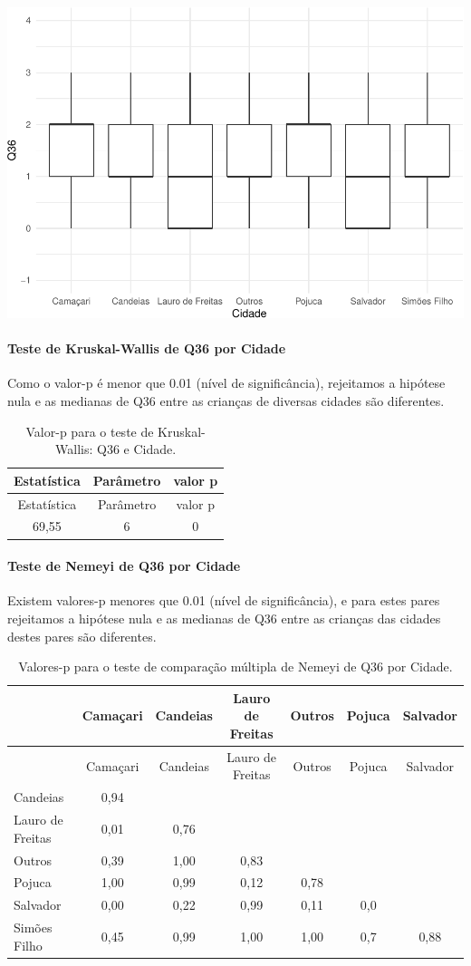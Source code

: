 \documentclass[]{article}
\let\oldparagraph\paragraph
\renewcommand{\paragraph}[1]{\oldparagraph{#1}\mbox{}}
\begin{document}
\begin{center}\includegraphics[width=0.75\linewidth]{relatorio_covid19_files/figure-latex/unnamed-chunk-1315-1} \end{center}

\hypertarget{teste-de-kruskal-wallis-de-q36-por-cidade}{%
\paragraph{Teste de Kruskal-Wallis de Q36 por Cidade}\label{teste-de-kruskal-wallis-de-q36-por-cidade}}

Como o valor-p é menor que 0.01 (nível de significância), rejeitamos a hipótese nula e as medianas de Q36 entre as crianças de diversas cidades são diferentes.

\begin{longtable}[]{@{}ccc@{}}
\caption{\label{tab:unnamed-chunk-1317}Valor-p para o teste de Kruskal-Wallis: Q36 e Cidade.}\tabularnewline
\toprule
Estatística & Parâmetro & valor p\tabularnewline
\midrule
\endfirsthead
\toprule
Estatística & Parâmetro & valor p\tabularnewline
\midrule
\endhead
69,55 & 6 & 0\tabularnewline
\bottomrule
\end{longtable}

\hypertarget{teste-de-nemeyi-de-q36-por-cidade}{%
\paragraph{Teste de Nemeyi de Q36 por Cidade}\label{teste-de-nemeyi-de-q36-por-cidade}}

Existem valores-p menores que 0.01 (nível de significância), e para estes pares rejeitamos a hipótese nula e as medianas de Q36 entre as crianças das cidades destes pares são diferentes.

\begin{longtable}[]{@{}lcccccc@{}}
\caption{\label{tab:unnamed-chunk-1319}Valores-p para o teste de comparação múltipla de Nemeyi de Q36 por Cidade.}\tabularnewline
\toprule
& Camaçari & Candeias & Lauro de Freitas & Outros & Pojuca & Salvador\tabularnewline
\midrule
\endfirsthead
\toprule
& Camaçari & Candeias & Lauro de Freitas & Outros & Pojuca & Salvador\tabularnewline
\midrule
\endhead
Candeias & 0,94 & & & & &\tabularnewline
Lauro de Freitas & 0,01 & 0,76 & & & &\tabularnewline
Outros & 0,39 & 1,00 & 0,83 & & &\tabularnewline
Pojuca & 1,00 & 0,99 & 0,12 & 0,78 & &\tabularnewline
Salvador & 0,00 & 0,22 & 0,99 & 0,11 & 0,0 &\tabularnewline
Simões Filho & 0,45 & 0,99 & 1,00 & 1,00 & 0,7 & 0,88\tabularnewline
\bottomrule
\end{longtable}
\end{document}
